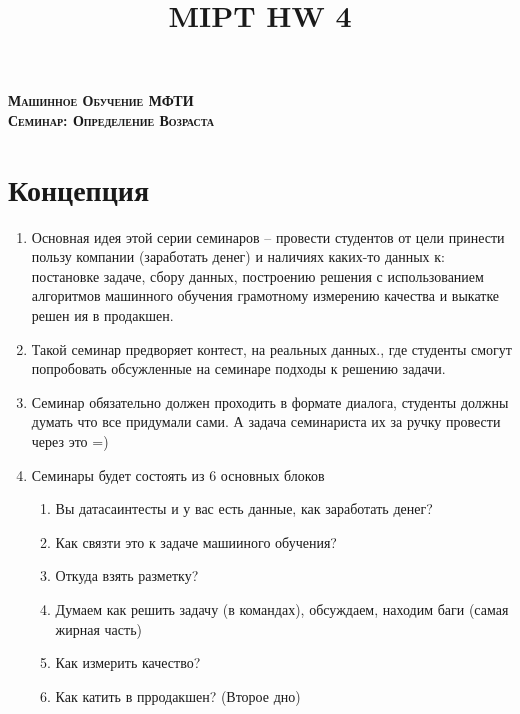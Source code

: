 \documentclass[a4paper, 12pt]{article}
\author{}
\date{}
\title{MIPT HW 4}
\begin{document}
  \begin{center}
    \textsc{\textbf{
    	{\Large Машинное Обучение МФТИ \\
        \vspace{0.5cm}
    	Семинар: Определение Возраста}}}
  \end{center}


\section*{Концепция}
	\begin{enumerate}
		\item Основная идея этой серии семинаров -- провести студентов от цели принести пользу компании (заработать денег) и наличиях каких-то данных к: постановке задаче, сбору данных, построению решения с использованием алгоритмов машинного обучения грамотному измерению качества и выкатке решен ия в продакшен. 
		
		\item Такой семинар предворяет контест, на реальных данных., где студенты смогут попробовать обсужленные на семинаре подходы к решению задачи. 
		
		\item Семинар обязательно должен проходить в формате диалога, студенты должны думать что все придумали сами. А задача семинариста их за ручку провести через это =)
		\item Семинары будет состоять из 6 основных блоков
		\begin{enumerate}
			\item Вы датасаинтесты и у вас есть данные, как заработать денег?
			\item Как связти это к задаче машииного обучения? 
			\item Откуда взять разметку?
			\item Думаем как решить задачу (в командах), обсуждаем, находим баги (самая жирная часть)
			\item Как измерить качество?
			\item Как катить в прродакшен?  (Второе дно) 
		\end{enumerate}
	\end{enumerate}
\end{document}
